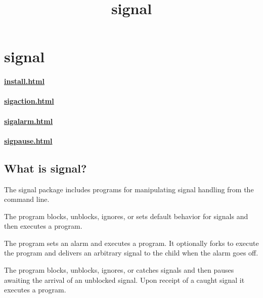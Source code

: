 \documentclass{book}
\title{signal}
\begin{document}
\section{signal}

\paragraph{\href{How to install signal}{install.html}}

\paragraph{\href{The \cmd{sigaction} program}{sigaction.html}}

\paragraph{\href{The \cmd{sigalarm} program}{sigalarm.html}}

\paragraph{\href{The \cmd{sigpause} program}{sigpause.html}}

\subsection{What is signal?}
The signal package includes programs for manipulating signal handling from the
command line.

The  program blocks, unblocks, ignores, or sets default behavior
for signals and then executes a program.

The  program sets an alarm and executes a program.  It optionally
forks to execute the program and delivers an arbitrary signal to the child when
the alarm goes off.

The  program blocks, unblocks, ignores, or catches signals and
then pauses awaiting the arrival of an unblocked signal.  Upon receipt of a
caught signal it executes a program.
\end{document}
